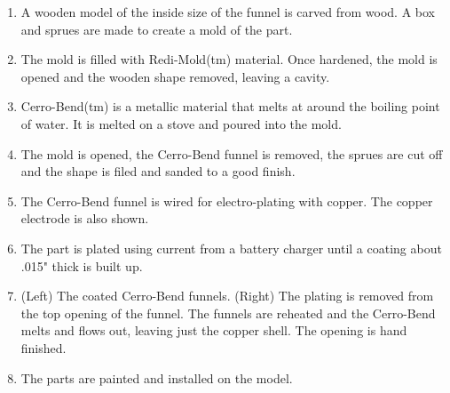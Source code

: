 \begin{enumerate}
  \item A wooden model of the inside size of the funnel is carved from wood. A
  box and sprues are made to create a mold of the part.
  \item The mold is filled with Redi-Mold(tm) material. Once hardened, the mold
  is opened and the wooden shape removed, leaving a cavity.
  \item Cerro-Bend(tm) is a metallic material that melts at around the boiling
  point of water. It is melted on a stove and poured into the mold.
  \item The mold is opened, the Cerro-Bend funnel is removed, the sprues are cut
  off and the shape is filed and sanded to a good finish.
  \item The Cerro-Bend funnel is wired for electro-plating with copper. The
  copper electrode is also shown.
  \item The part is plated using current from a battery charger until a coating
  about .015" thick is built up.
  \item (Left) The coated Cerro-Bend funnels. (Right) The plating is removed
  from the top opening of the funnel. The funnels are reheated and the
  Cerro-Bend melts and flows out, leaving just the copper shell. The opening is
  hand finished.
  \item The parts are painted and installed on the model.

\end{enumerate}

\secup
